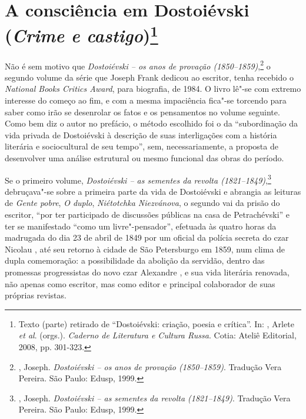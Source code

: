 \chapter{A consciência em Dostoiévski\\ (\emph{Crime e castigo})\footnote{Texto (parte) retirado de ``Dostoiévski: criação, poesia e crítica''. In: \protect{}, Arlete \emph{et al}. (orgs.). \emph{Caderno de Literatura e Cultura Russa}. Cotia: Ateliê Editorial, 2008, pp. 301-323.}}
\label{crimecastigo}

Não é sem motivo que \emph{Dostoiévski -- os anos de provação (1850--1859)},\footnote{, Joseph. \emph{Dostoiévski -- os anos de provação (1850--1859)}. Tradução Vera Pereira. São Paulo: Edusp, 1999.} o segundo volume da série que Joseph Frank dedicou ao escritor, tenha recebido o \emph{National Books Critics Award}, para biografia, de 1984. O livro lê"-se com extremo interesse do começo ao fim, e com a mesma impaciência fica"-se torcendo para saber como irão se desenrolar os fatos e os pensamentos no volume seguinte. Como bem diz o autor no prefácio, o método escolhido foi o da ``subordinação da vida privada de Dostoiévski à descrição de suas interligações com a história literária e sociocultural de seu tempo'', sem, necessariamente, a proposta de desenvolver uma análise estrutural ou mesmo funcional das obras do período.

Se o primeiro volume, \emph{Dostoiévski -- as sementes da revolta
(1821--1849)},\footnote{, Joseph. \emph{Dostoiévski -- as sementes
da revolta (1821--1849)}. Tradução Vera Pereira. São Paulo: Edusp,
  1999.} debruçava"-se sobre a primeira parte da vida de Dostoiévski e
abrangia as leituras de \emph{Gente pobre}, \emph{O duplo},
\emph{Niétotchka Niezvánova}, o segundo vai da prisão do escritor, ``por
ter participado de discussões públicas na casa de Petrachévski'' e ter
se manifestado ``como um livre"-pensador'', efetuada às quatro horas da
madrugada do dia 23 de abril de 1849 por um oficial da polícia secreta
do czar Nicolau , até seu retorno à cidade de São Petersburgo em 1859,
num clima de dupla comemoração: a possibilidade da abolição da servidão, dentro das
promessas progressistas do novo czar Alexandre , e sua vida literária
renovada, não apenas como escritor, mas como editor e principal
colaborador de suas próprias revistas.

